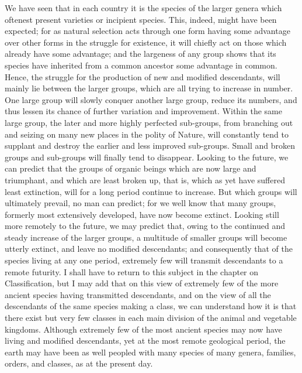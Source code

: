 We have seen that in each country it is the species of the larger genera which oftenest present varieties or incipient species. This, indeed, might have been expected; for as natural selection acts through one form having some advantage over other forms in the struggle for existence, it will chiefly act on those which already have some advantage; and the largeness of any group shows that its species have inherited from a common ancestor some advantage in common. Hence, the struggle for the production of new and modified descendants, will mainly lie between the larger groups, which are all trying to increase in number. One large group will slowly conquer another large group, reduce its numbers, and thus lessen its chance of further variation and improvement. Within the same large group, the later and more highly perfected sub-groups, from branching out and seizing on many new places in the polity of Nature, will constantly tend to supplant and destroy the earlier and less improved sub-groups. Small and broken groups and sub-groups will finally tend to disappear. Looking to the future, we can predict that the groups of organic beings which are now large and triumphant, and which are least broken up, that is, which as yet have suffered least extinction, will for a long period continue to increase. But which groups will ultimately prevail, no man can predict; for we well know that many groups, formerly most extensively developed, have now become extinct. Looking still more remotely to the future, we may predict that, owing to the continued and steady increase of the larger groups, a multitude of smaller groups will become utterly extinct, and leave no modified descendants; and consequently that of the species living at any one period, extremely few will transmit descendants to a remote futurity. I shall have to return to this subject in the chapter on Classification, but I may add that on this view of extremely few of the more ancient species having transmitted descendants, and on the view of all the descendants of the same species making a class, we can understand how it is that there exist but very few classes in each main division of the animal and vegetable kingdoms. Although extremely few of the most ancient species may now have living and modified descendants, yet at the most remote geological period, the earth may have been as well peopled with many species of many genera, families, orders, and classes, as at the present day.

